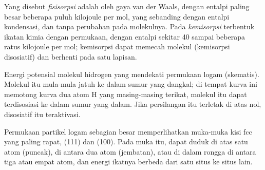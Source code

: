 \begin{definition}\label{def:b3:surfaces-catalysis:physi-chemi}
Yang disebut \emph{fisisorpsi} adalah  oleh gaya van der
Waals, dengan entalpi  paling besar beberapa puluh kilojoule per mol,
yang sebanding dengan entalpi kondensasi, dan tanpa perubahan pada molekulnya.
Pada \emph{kemisorpsi} terbentuk ikatan kimia dengan permukaan,
dengan entalpi sekitar 40 sampai beberapa ratus kilojoule per mol; kemisorpsi
dapat memecah molekul (kemisorpsi disosiatif) dan berhenti pada satu lapisan.
\end{definition}

\begin{omfigure}

{\small Energi potensial molekul hidrogen yang mendekati permukaan logam
(skematis). Molekul itu mula-mula jatuh ke dalam sumur  yang dangkal;
di tempat kurva ini memotong kurva dua atom H yang masing-masing terikat,
molekul itu dapat terdisosiasi ke dalam sumur  yang dalam. Jika
persilangan itu terletak di atas nol,  disosiatif itu teraktivasi.}
\end{omfigure}

Permukaan partikel logam sebagian besar memperlihatkan muka-muka kisi fcc yang
paling rapat, (111) dan (100). Pada muka itu,  dapat duduk di atas satu
atom (puncak), di antara dua atom (jembatan), atau di dalam rongga di antara
tiga atau empat atom, dan energi ikatnya berbeda dari satu situs ke situs lain.

